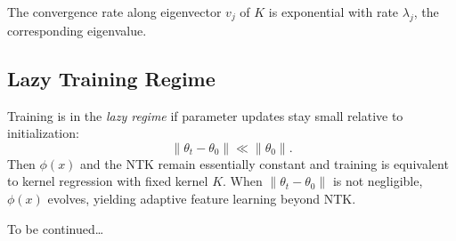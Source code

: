The convergence rate along eigenvector $v_j$ of $K$ is exponential with
rate $\lambda_j$, the corresponding eigenvalue.

%
%



\subsection{Lazy Training Regime}

Training is in the \emph{lazy regime} if parameter updates stay small relative to initialization:
\[
	\|\theta_t - \theta_0\| \ll \|\theta_0\|.
\]
Then $\phi(x)$ and the NTK remain essentially constant and training is equivalent to kernel regression with fixed kernel $K$. When $\|\theta_t-\theta_0\|$ is not negligible, $\phi(x)$ evolves, yielding adaptive feature learning beyond NTK.

To be continued\ldots
